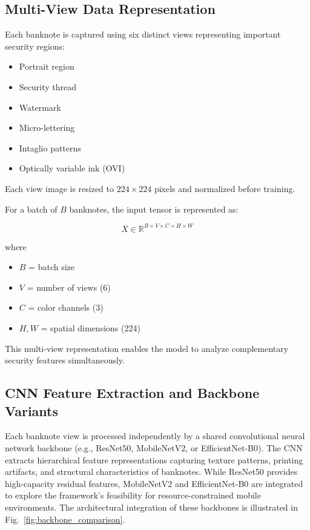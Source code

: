 \documentclass[preprint,12pt,authoryear]{elsarticle}
\begin{document}
\subsection{Multi-View Data Representation}

Each banknote is captured using six distinct views representing important security regions:

\begin{itemize}
\item Portrait region
\item Security thread
\item Watermark
\item Micro-lettering
\item Intaglio patterns
\item Optically variable ink (OVI)
\end{itemize}

Each view image is resized to $224 \times 224$ pixels and normalized before training.

For a batch of $B$ banknotes, the input tensor is represented as:

\begin{equation}
X \in \mathbb{R}^{B \times V \times C \times H \times W}
\end{equation}

where

\begin{itemize}
\item $B$ = batch size
\item $V$ = number of views (6)
\item $C$ = color channels (3)
\item $H,W$ = spatial dimensions (224)
\end{itemize}

This multi-view representation enables the model to analyze complementary security features simultaneously.


\subsection{CNN Feature Extraction and Backbone Variants}

Each banknote view is processed independently by a shared convolutional neural network backbone (e.g., ResNet50, MobileNetV2, or EfficientNet-B0). The CNN extracts hierarchical feature representations capturing texture patterns, printing artifacts, and structural characteristics of banknotes. While ResNet50 provides high-capacity residual features, MobileNetV2 and EfficientNet-B0 are integrated to explore the framework's feasibility for resource-constrained mobile environments. The architectural integration of these backbones is illustrated in Fig.~\ref{fig:backbone_comparison}.
\end{document}
